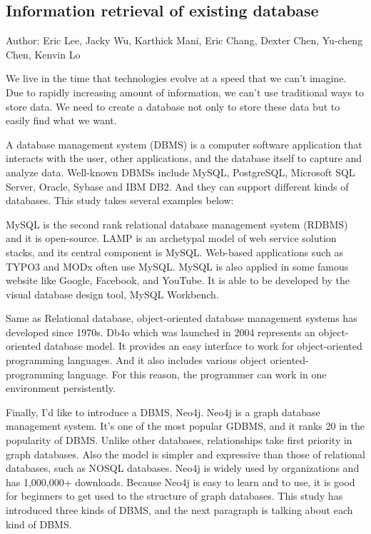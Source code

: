 	
\subsection{Information retrieval of existing database}
Author: Eric Lee, Jacky Wu, Karthick Mani, Eric Chang, Dexter Chen, Yu-cheng Chen, Kenvin Lo

We live in the time that technologies evolve at a speed that we can't imagine. Due to rapidly increasing amount of information, we can't use traditional ways to store data. We need to create a database not only to store these data but to easily find what we want.

A database management system (DBMS) is a computer software application that interacts with the user, other applications, and the database itself to capture and analyze data. Well-known DBMSs include MySQL, PostgreSQL, Microsoft SQL Server, Oracle, Sybase and IBM DB2. And they can support different kinds of databases. This study takes several examples below:

MySQL is the second rank relational database management system (RDBMS) and it is open-source. LAMP is an archetypal model of web service solution stacks, and its central component is MySQL. Web-based applications such as TYPO3 and MODx often use MySQL. MySQL is also applied in some famous website like Google, Facebook, and YouTube. It is able to be developed by the visual database design tool, MySQL Workbench.

Same as Relational database, object-oriented database management systems has developed since 1970s. Db4o which was launched in 2004 represents an object-oriented database model. It provides an easy interface to work for object-oriented programming languages. And it also includes various object oriented-programming language. For this reason, the programmer can work in one environment persistently.

Finally, I’d like to introduce a DBMS, Neo4j. Neo4j is a graph database management system. It’s one of the most popular GDBMS, and it ranks 20 in the popularity of DBMS. Unlike other databases, relationships take first priority in graph databases. Also the model is simpler and expressive than those of relational databases, such as NOSQL databases. Neo4j is widely used by organizations and has 1,000,000+ downloads. Because Neo4j is easy to learn and to use, it is good for beginners to get used to the structure of graph databases. This study has introduced three kinds of DBMS, and the next paragraph is talking about each kind of DBMS.

